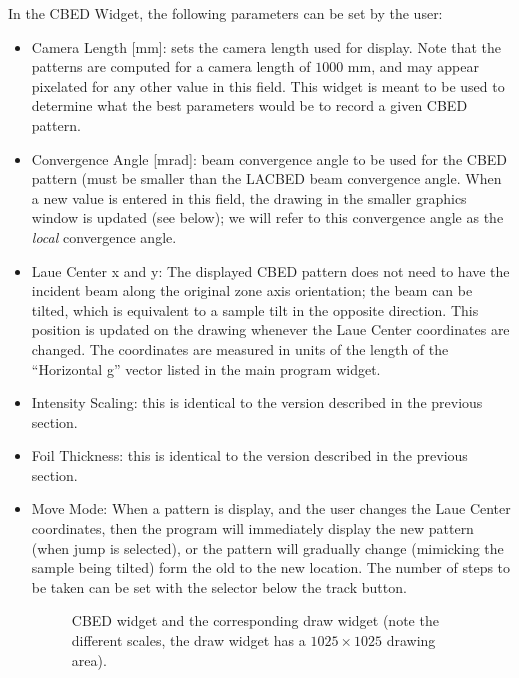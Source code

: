 \documentclass[DIV=calc, paper=letter, fontsize=11pt]{scrartcl}	 %
\begin{document}
In the CBED Widget, the following parameters can be set by the user:
\begin{itemize}
	\item \textsf{Camera Length [mm]}: sets the camera length used for display.  Note that the patterns are computed for a camera length
	of $1000$ mm, and may appear pixelated for any other value in this field.  This widget is meant to be used to determine what the best
	parameters would be to record a given CBED pattern. 
	\item \textsf{Convergence Angle [mrad]}: beam convergence angle to be used for the CBED pattern (must be smaller than the LACBED beam convergence 
	angle.  When a new value is entered in this field, the drawing in the smaller graphics window is updated (see below); we will refer to this
	convergence angle as the \textit{local} convergence angle. 
	\item \textsf{Laue Center x and y}: The displayed CBED pattern does not need to have the incident beam along the original zone axis orientation;
	the beam can be tilted, which is equivalent to a sample tilt in the opposite direction.  
	This position is updated on the drawing whenever the Laue Center coordinates are changed.  The coordinates are measured
	in units of the length of the ``Horizontal g'' vector listed in the main program widget.
	\item \textsf{Intensity Scaling}: this is identical to the version described in the previous section.
	\item \textsf{Foil Thickness}: this is identical to the version described in the previous section.
	\item \textsf{Move Mode}: When a pattern is display, and the user changes the Laue Center coordinates, then the program will immediately
	display the new pattern (when \textsf{jump} is selected), or the pattern will gradually change (mimicking the sample being tilted) form the old
	to the new location.  The number of steps to be taken can be set with the selector below the \textsf{track} button.

\begin{figure}[t]
\leavevmode\centering
\epsfxsize=6.0in
\caption{\label{fig:widget3}\textsf{CBED} widget and the corresponding draw widget (note the different scales, the draw widget has a $1025\times 1025$ drawing area).}
\end{figure}


\end{itemize}
\end{document}
